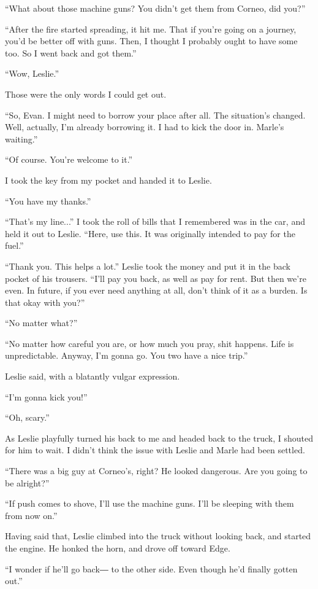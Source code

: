 \documentclass[oneside]{book}
\begin{document}
“What about those machine guns? You didn’t get them from Corneo, did you?”

“After the fire started spreading, it hit me. That if you’re going on a journey, you’d be better off with guns. Then, I thought I probably ought to have some too. So I went back and got them.”

“Wow, Leslie.”

Those were the only words I could get out.

“So, Evan. I might need to borrow your place after all. The situation’s changed. Well, actually, I’m already borrowing it. I had to kick the door in. Marle’s waiting.”

“Of course. You’re welcome to it.”

I took the key from my pocket and handed it to Leslie.

“You have my thanks.”

“That’s my line...” I took the roll of bills that I remembered was in the car, and held it out to Leslie. “Here, use this. It was originally intended to pay for the fuel.”

“Thank you. This helps a lot.” Leslie took the money and put it in the back pocket of his trousers. “I’ll pay you back, as well as pay for rent. But then we’re even. In future, if you ever need anything at all, don’t think of it as a burden. Is that okay with you?”

“No matter what?”

“No matter how careful you are, or how much you pray, shit happens. Life is unpredictable. Anyway, I’m gonna go. You two have a nice trip.”

Leslie said, with a blatantly vulgar expression.

“I’m gonna kick you!”

“Oh, scary.”

As Leslie playfully turned his back to me and headed back to the truck, I shouted for him to wait. I didn’t think the issue with Leslie and Marle had been settled.

“There was a big guy at Corneo’s, right? He looked dangerous. Are you going to be alright?”

“If push comes to shove, I’ll use the machine guns. I’ll be sleeping with them from now on.”

Having said that, Leslie climbed into the truck without looking back, and started the engine. He honked the horn, and drove off toward Edge.

“I wonder if he’ll go back― to the other side. Even though he’d finally gotten out.”
\end{document}
